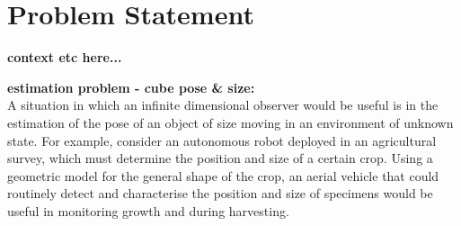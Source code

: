 \chapter{Problem Statement}
\textbf{context etc here...}
\begin{comment}
\textbf{context:}
Advances in hardware and manufacturing have made autonomous and semi-autonomous robots more available. Use in industry and even general public has increased. Full autonomous robots are still limited to structured environments and tasks such as in factories and warehouses.
Before robots can operate autonomously in unstructured environments, new sensor models are required to more effectively observe and represent complex environment states. \textbf{TODO:} \textit{Why are new sensor models required? Check if this is covered in literature review. If not, need to expand on this.}

\textbf{problem/lacking:}
One method of estimating the state of the environment is to use a state observer. The majority of observer implementations do not take into account the natural symmetries of the dynamics of the state. Doing so has shown to be beneficial in both the design of observers, and improved convergence properties.
However, these invariant observer methods are still limited to finite dimensional systems. In many implementations involving infinite-dimensional systems, the system is discretised to a finite dimensional one prior to observer design.  \textbf{TODO:} \textit{How does this influence performance?}

What is needed is a theory of infinite dimensional, symmetry preserving observers, + design principles.

\textbf{what will this theory provide?:}
This theory will simplify invariant observer design for infinite dimensional systems. Only discretising after observer design will maximise the potential of dense sensors. This will allow for more accurate and fast estimation of complex environments,

\textbf{approach:}
This project aims to develop some of this theory. The approach taken will be to design an invariant observer for a specific infinite dimensional system, before generalising the results.
\end{comment}

\textbf{estimation problem - cube pose \& size:}\\

A situation in which an infinite dimensional observer would be useful is in the estimation of the pose of an object of size moving in an environment of unknown state.
For example, consider an autonomous robot deployed in an agricultural survey, which must determine the position and size of a certain crop. Using a geometric model for the general shape of the crop, an aerial vehicle that could routinely detect and characterise the position and size of specimens would be useful in monitoring growth and during harvesting.

